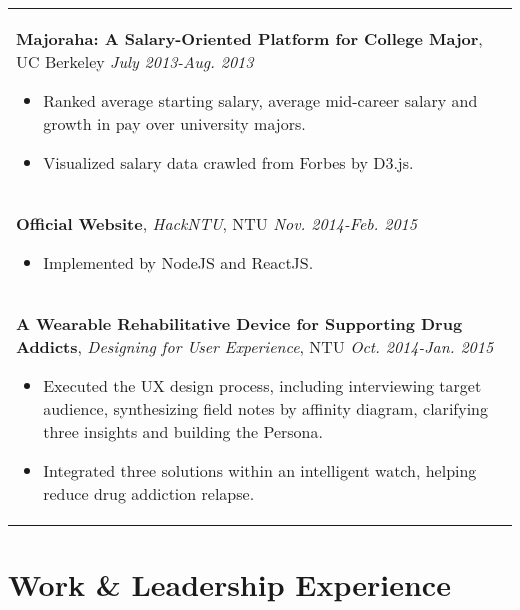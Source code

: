 \documentclass[a4paper,10pt]{article} %
\begin{document}
\begin{tabular}{p{17cm}}
\normalsize\textbf{Majoraha: A Salary-Oriented Platform for College Major}, UC Berkeley \hfill  {\it July 2013-Aug. 2013}
\vspace{0.5mm}
\begin{itemize}
\item Ranked average starting salary, average mid-career salary and growth in pay over university majors.
\item Visualized salary data crawled from Forbes by D3.js. \vspace*{-\baselineskip}
\end{itemize}\\
\vspace{0.5mm}

\normalsize\textbf{Official Website}, {\it{HackNTU}}, NTU \hfill {\it Nov. 2014-Feb. 2015}
\vspace{0.5mm}
\begin{itemize}
\item Implemented by NodeJS and ReactJS. \vspace*{-\baselineskip}
\end{itemize}\\
\vspace{0.5mm}

\normalsize\textbf{A Wearable Rehabilitative Device for Supporting Drug Addicts}, {\it{Designing for User Experience}}, NTU \hfill {\it Oct. 2014-Jan. 2015}
\vspace{0.5mm}
\begin{itemize}
	\item Executed the UX design process, including interviewing target audience, synthesizing field notes by affinity diagram, clarifying three insights and building the Persona.
\item Integrated three solutions within an intelligent watch, helping reduce drug addiction relapse.\vspace*{-\baselineskip}
\end{itemize} \\



\end{tabular}


\section{\textbf{Work \& Leadership Experience}}
\end{document}
